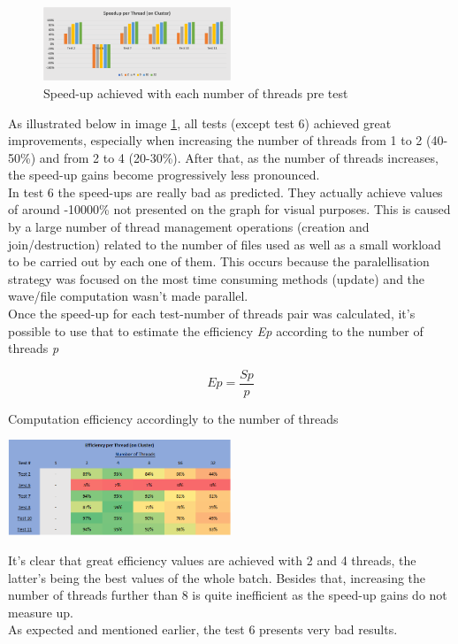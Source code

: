 \documentclass[10pt,journal,compsoc]{IEEEtran}
\begin{document}
\begin{figure}[h]
\centering
\includegraphics[width=0.5\textwidth]{../DRAFT/PerformanceAnalysis - Prints/Speedup per Thread (cluster) - Chart.PNG}
\caption{Speed-up achieved with each number of threads pre test}
\label{Sup-pic}
\end{figure}
As illustrated below in image \ref{Sup-pic}, all tests (except test 6) achieved great improvements, especially when increasing the number of threads from 1 to 2 (40-50\%) and from 2 to 4 (20-30\%). After that, as the number of threads increases, the speed-up gains become progressively less pronounced.
\\
In test 6 the speed-ups are really bad as predicted. They actually achieve values of around -10000\% not presented on the graph for visual purposes. This is caused by a large number of thread management operations (creation and join/destruction) related to the number of files used as well as a small workload to be carried out by each one of them. This occurs because the paralellisation strategy was focused on the most time consuming methods (update) and the wave/file computation wasn't made parallel.
\\
Once the speed-up for each test-number of threads pair was calculated, it's possible to use that to estimate the efficiency \textit{Ep} according to the number of threads \textit{p}

\[ Ep = \frac{Sp}{p} \]

\begin{table}[h]
\centering
\caption{Computation efficiency accordingly to the number of threads}
\includegraphics[width=0.5\textwidth]{../DRAFT/PerformanceAnalysis - Prints/Efficiency per Thread (cluster) - Chart.PNG}
\label{effic-table}
\end{table}

It's clear that great efficiency values are achieved with 2 and 4 threads, the latter's being the best values of the whole batch. Besides that, increasing the number of threads further than 8 is quite inefficient as the speed-up gains do not measure up.
\\
As expected and mentioned earlier, the test 6 presents very bad results.
\end{document}
